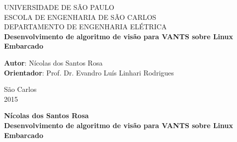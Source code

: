 \begin{titlepage}
	
	\begin{center}
		\Huge{UNIVERSIDADE DE SÃO PAULO}\\
		\vspace{0.02\textheight}
		\huge{ESCOLA DE ENGENHARIA DE SÃO CARLOS}\\
		\vspace{0.01\textheight}
		\huge{DEPARTAMENTO DE ENGENHARIA ELÉTRICA}\\
		\vspace{0.2\textheight}
		\huge{\textbf{Desenvolvimento de algoritmo de visão para VANTS sobre Linux Embarcado}}
		\vspace{0.2\textheight}
	\end{center}
		
		\large
		{
			\begin{flushleft}
			\Large{ \textbf{Autor}: \hspace{1cm} Nícolas dos Santos Rosa}\\
			\Large{ \textbf{Orientador}: \hspace{0.3cm} Prof. Dr. Evandro Luís Linhari Rodrigues }\\
			\end{flushleft}
	
			\begin{center}
				\vspace{0.09\textheight}
				\Large{São Carlos}\\
				\Large{2015}
			\end{center}
		}
	
\end{titlepage}


\cleardoublepage

	\begin{center}
	\vspace{-0.06\textheight}
		\Large{\textbf{Nícolas dos Santos Rosa}}\\
		\vspace{0.15\textheight}
		\Huge{\textbf{Desenvolvimento de algoritmo de visão para VANTS sobre Linux Embarcado}} 
		\vspace{0.08\textheight}
	\end{center}
		
